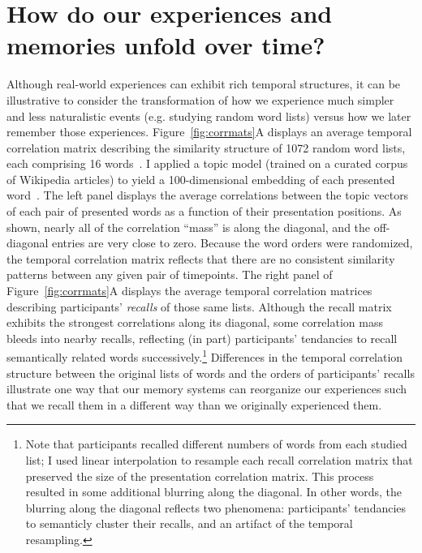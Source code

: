 \documentclass{article}
\begin{document}
\section*{How do our experiences and memories unfold over time?}
Although real-world experiences can exhibit rich temporal structures, it can be illustrative to consider the transformation of how we experience much simpler and less naturalistic events (e.g. studying random word lists) versus how we later remember those experiences.  Figure~\ref{fig:corrmats}A displays an average temporal correlation matrix describing the similarity structure of 1072 random word lists, each comprising 16 words~\citep{ZimaEtal18}.  I applied a topic model (trained on a curated corpus of Wikipedia articles) to yield a 100-dimensional embedding of each presented word~\citep{BleiEtal03}.  The left panel displays the average correlations between the topic vectors of each pair of presented words as a function of their presentation positions.  As shown, nearly all of the correlation ``mass'' is along the diagonal, and the off-diagonal entries are very close to zero.  Because the word orders were randomized, the temporal correlation matrix reflects that there are no consistent similarity patterns between any given pair of timepoints.  The right panel of Figure~\ref{fig:corrmats}A displays the average temporal correlation matrices describing participants' \textit{recalls} of those same lists.  Although the recall matrix exhibits the strongest correlations along its diagonal, some correlation mass bleeds into nearby recalls, reflecting (in part) participants' tendancies to recall semantically related words successively.\footnote{Note that participants recalled different numbers of words from each studied list; I used linear interpolation to resample each recall correlation matrix that preserved the size of the presentation correlation matrix.  This process resulted in some additional blurring along the diagonal.  In other words, the blurring along the diagonal reflects two phenomena: participants' tendancies to semanticly cluster their recalls, and an artifact of the temporal resampling.}  Differences in the temporal correlation structure between the original lists of words and the orders of participants' recalls illustrate one way that our memory systems can reorganize our experiences such that we recall them in a different way than we originally experienced them.
\end{document}
